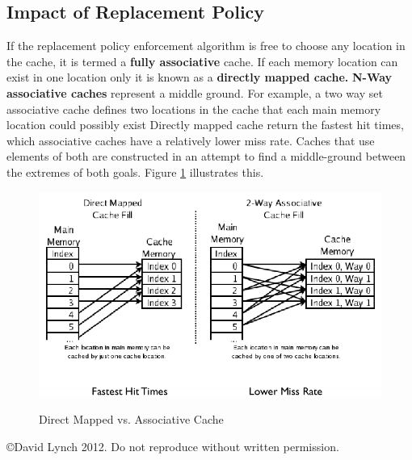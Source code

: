 \documentclass[10pt,a4paper]{article}
\begin{document}
\subsection{Impact of Replacement Policy}
If the replacement policy enforcement algorithm is free to choose any location in the cache, it is termed a \textbf{fully associative} cache. If each memory location can exist in one location only it is known as a \textbf{directly mapped cache.} \textbf{N-Way associative caches} represent a middle ground. For example, a two way set associative cache defines two locations in the cache that each main memory location could possibly exist\newline\newline
Directly mapped cache return the fastest hit times, which associative caches have a relatively lower miss rate. Caches that use elements of both are constructed in an attempt to find a middle-ground between the extremes of both goals. Figure \ref{cache} illustrates this. 
\begin{figure}
\caption{Direct Mapped vs. Associative Cache \cite{CACHE}}
\begin{center}
\includegraphics[scale=0.45]{../images/cache.png}
\label{cache}
\end{center}
\end{figure}
{}

\begin{center}
{\small \copyright  David Lynch 2012. Do not reproduce without written permission.}
\end{center}
\end{document}
